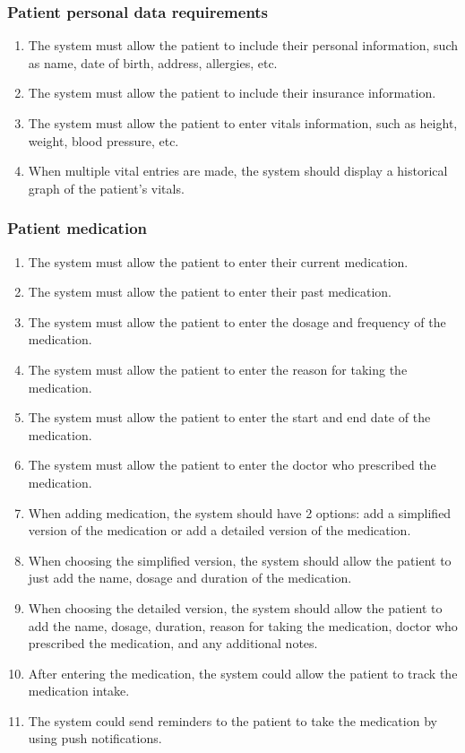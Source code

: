 \subsubsection{Patient personal data requirements}
\begin{enumerate}
    \item The system must allow the patient to include their personal information, such as name, date of birth, address, allergies, etc.
    \item The system must allow the patient to include their insurance information.
    \item The system must allow the patient to enter vitals information, such as height, weight, blood pressure, etc.
    \item When multiple vital entries are made, the system should display a historical graph of the patient's vitals.
\end{enumerate}

\subsubsection{Patient medication}
\begin{enumerate}
    \item The system must allow the patient to enter their current medication.
    \item The system must allow the patient to enter their past medication.
    \item The system must allow the patient to enter the dosage and frequency of the medication.
    \item The system must allow the patient to enter the reason for taking the medication.
    \item The system must allow the patient to enter the start and end date of the medication.
    \item The system must allow the patient to enter the doctor who prescribed the medication.
    \item When adding medication, the system should have 2 options: add a simplified version of the medication or add a detailed version of the medication.
    \item When choosing the simplified version, the system should allow the patient to just add the name, dosage and duration of the medication.
    \item When choosing the detailed version, the system should allow the patient to add the name, dosage, duration, reason for taking the medication, doctor who prescribed the medication, and any additional notes.
    \item After entering the medication, the system could allow the patient to track the medication intake.
    \item The system could send reminders to the patient to take the medication by using push notifications.
\end{enumerate}

